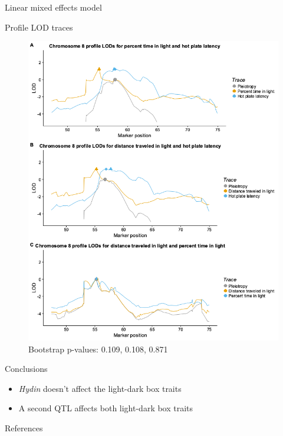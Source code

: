 \documentclass[final,hyperref={pdfpagelabels=false}]{beamer}
\begin{document}
\begin{frame}[t]
\begin{columns}[t]
\begin{column}{.465\textwidth}
\begin{block}{Linear mixed effects model}
\end{block}

\begin{block}{Profile LOD traces}
\begin{figure}
\includegraphics[width=0.5\linewidth]{all3.png}
\caption{Bootstrap p-values: 0.109, 0.108, 0.871}

\end{figure}

\end{block}





\begin{block}{Conclusions}

\begin{itemize}
\item \textit{Hydin} doesn't affect the light-dark box traits
\item A second QTL affects both light-dark box traits
\end{itemize}

\end{block}



\begin{block}{References}
        

\end{block}
\end{column}
\end{columns}
\end{frame}
\end{document}
